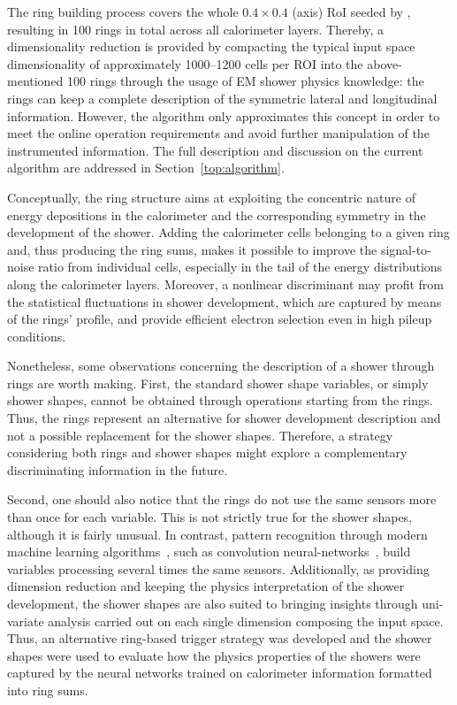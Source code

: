 The ring building process covers the whole $0.4\times0.4$ (\etaphi axis) RoI
seeded by \licalo, resulting in 100 rings in total across all calorimeter layers.
Thereby, a dimensionality reduction is provided by compacting the
typical input space dimensionality of approximately 1000--1200 cells per ROI into
the above-mentioned 100 rings through the usage of EM shower physics knowledge: the rings can keep a complete description of the symmetric lateral and
longitudinal information. However, the algorithm only approximates this concept
in order to meet the online operation requirements and avoid further
manipulation of the instrumented information. The full description and
discussion on the current algorithm are addressed in
Section~\ref{top:algorithm}.



Conceptually, the ring structure aims at exploiting the concentric nature of energy depositions in the calorimeter and the corresponding symmetry in the development of the shower.  Adding the calorimeter cells belonging to a given ring and, thus producing the ring sums, makes it possible to improve the signal-to-noise ratio from individual cells, especially in the tail of the energy distributions along the calorimeter layers.  Moreover, a nonlinear discriminant may profit from the statistical fluctuations in shower development, which are captured by means of the rings' profile, and provide efficient electron selection even in high pileup conditions.

Nonetheless, some observations concerning the description of a shower through rings are worth making. First, the standard shower shape variables, or simply shower shapes, cannot be obtained through operations starting from the rings.  Thus, the rings represent an alternative for shower development description and not a possible replacement for the shower shapes.  Therefore, a strategy considering both rings and shower shapes might explore a complementary discriminating information in the future.



Second, one should also notice
that the rings do not use the same sensors more than once for each variable.
This is not strictly true for the shower shapes, although it is fairly unusual.
In contrast, pattern recognition through modern machine learning
algorithms~\cite{Engelbrecht2007,Goodfellow2016}, such as convolution
neural-networks~\cite{Gu2018}, build variables processing several times
the same sensors. Additionally, as providing dimension reduction and keeping the physics interpretation of the shower development, the shower shapes are also suited to bringing insights through uni-variate analysis carried out on each
single dimension composing the input space.
Thus, an alternative ring-based trigger strategy was developed and the shower shapes were used to evaluate how the physics properties of the showers were captured by the neural networks trained on calorimeter information formatted into ring sums. 









